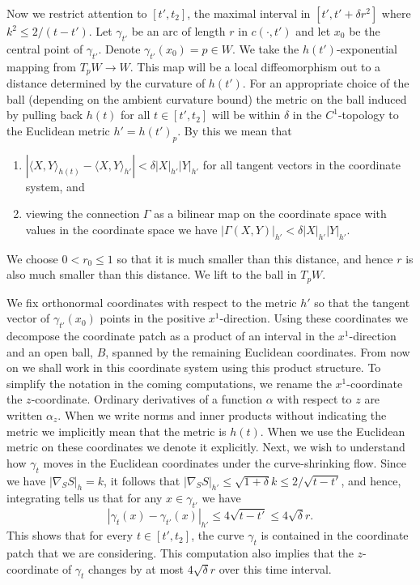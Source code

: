 Now we restrict attention to $[t',t_2]$, the maximal interval in
$[t',t'+\delta r^2]$ where $k^2\le 2/(t-t')$. Let $\gamma_{t'}$ be
an arc of length $r$ in $c(\cdot,t')$ and let $x_0$ be the central
point of $\gamma_{t'}$. Denote $\gamma_{t'}(x_0)=p\in W$. We take
the $h(t')$-exponential mapping from $T_pW\to W$. This map will be a
local diffeomorphism out to a distance determined by the curvature
of $h(t')$.   For an appropriate choice of the ball (depending on
the ambient curvature bound) the metric on the ball induced by
pulling back $h(t)$ for all $t\in [t',t_2]$ will be within $\delta$
in the $C^1$-topology to the Euclidean metric $h'=h(t')_p$. By this
we mean that
\begin{enumerate}
\item[(1)] $\left|\langle X,Y\rangle_{h(t)}-\langle
X,Y\rangle_{h'}\right|<\delta |X|_{h'}|Y|_{h'}$ for all tangent vectors in the
coordinate system, and \item[(2)] viewing the connection $\Gamma$ as a bilinear
map on the coordinate space with values in the coordinate space we have $
|\Gamma(X,Y)|_{h'}<\delta |X|_{h'}|Y|_{h'}$.
\end{enumerate}

We choose $0<r_0\le 1$ so that it is much smaller than this
distance, and hence  $r$ is also much smaller than this distance. We
lift to the ball in $T_pW$.

 We fix orthonormal coordinates with respect to the metric $h'$ so
that the tangent vector of $\gamma_{t'}(x_0)$ points in the positive
$x^1$-direction. Using these coordinates we decompose the coordinate
patch as a product of an interval in the $x^1$-direction and an open
ball, $B$, spanned by the remaining Euclidean coordinates. From now
on we shall work in this coordinate system using this product
structure.  To simplify the notation in the coming computations, we
rename the $x^1$-coordinate the $z$-coordinate. Ordinary derivatives
of a function $\alpha$ with respect to $z$ are written $\alpha_z$.
When we write norms and inner products without indicating the metric
we implicitly mean that the metric is $h(t)$. When we use the
Euclidean metric on these coordinates we denote it explicitly. Next,
we wish to understand how $\gamma_t$ moves in the Euclidean
coordinates under the curve-shrinking flow. Since we have
$|\nabla_SS|_{h}=k$, it follows that $|\nabla_SS|_{h'}\le
\sqrt{1+\delta}k\le 2/\sqrt{t-t'}$, and hence, integrating tells us
that for any $x\in \gamma_{t'}$ we have
$$\left|\gamma_t(x)-\gamma_{t'}(x)\right|_{h'}\le 4\sqrt{t-t'}\le 4\sqrt{\delta}r.$$
This shows that for every $t\in [t',t_2]$, the curve $\gamma_t$ is
contained in the coordinate patch that we are considering. This
computation also implies that the $z$-coordinate of $\gamma_t$
changes by at most $4\sqrt{\delta} r$ over this time interval.



